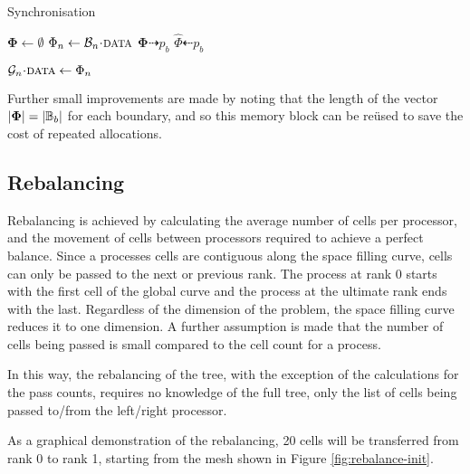 \documentclass{IIBproject}
\newcommand{\vect} [1] {\bm{#1}}
\newcommand{\dra}{\dashrightarrow}
\newcommand{\dla}{\dashleftarrow}
\newcommand{\acc}{{\mkern 0.5mu\cdot\mkern 0.5mu}}
\numberwithin{figure}{section}
\begin{document}
\begin{algorithm}[H]
    \caption{Synchronisation}
    \label{alg:sync-sendrecv}

    \begin{algorithmic}
            \State $\vect{\Phi} \gets \emptyset$
                \State $\Phi_n \gets \mathcal{B}_n\acc\textproc{data}$
            \EndFor
            \Send $\vect{\Phi} \dra p_b$
        \EndFor
        \Statex
            \Recv $\hat \Phi \dla p_b$

                \State $\mathcal{G}_n\acc\textproc{data} \gets \Phi_n$
            \EndFor
        \EndFor
    \end{algorithmic}
\end{algorithm}

Further small improvements are made by noting that the length of the vector $\abs{\vect{\Phi}} = \abs{\mathbb{B}_b}$ for each boundary, and so this memory block can be re\"used to save the cost of repeated allocations.


\subsection{Rebalancing}

Rebalancing is achieved by calculating the average number of cells per processor, and the movement of cells between processors required to achieve a perfect balance. Since a processes cells are contiguous along the space filling curve, cells can only be passed to the next or previous rank. The process at rank 0 starts with the first cell of the global curve and the process at the ultimate rank ends with the last. Regardless of the dimension of the problem, the space filling curve reduces it to one dimension. A further assumption is made that the number of cells being passed is small compared to the cell count for a process.

In this way, the rebalancing of the tree, with the exception of the calculations for the pass counts, requires no knowledge of the full tree, only the list of cells being passed to/from the left/right processor.

As a graphical demonstration of the rebalancing, 20 cells will be transferred from rank 0 to rank 1, starting from the mesh shown in Figure \ref{fig:rebalance-init}.
\end{document}
